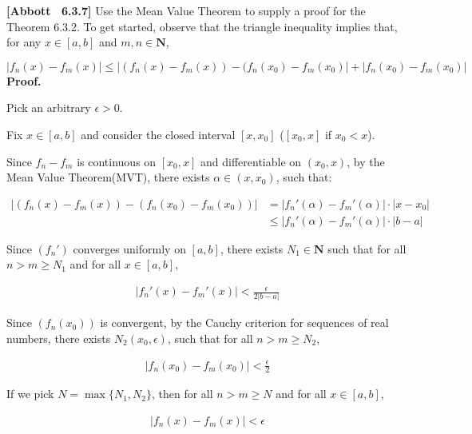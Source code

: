 \documentclass[10pt]{article}
\begin{document}
\textbf{[Abbott \ 6.3.7] }Use the Mean Value Theorem to supply a proof for the Theorem 6.3.2. To get started, observe that the triangle inequality implies that, for any $\displaystyle x\in [ a,b]$ and $\displaystyle m,n\in \mathbf{N}$,




\begin{equation*}
|f_{n}( x) -f_{m}( x) |\leq |( f_{n}( x) -f_{m}( x)) -( f_{n}( x_{0}) -f_{m}( x_{0}) |+|f_{n}( x_{0}) -f_{m}( x_{0}) |
\end{equation*}
\textbf{Proof.}



Pick an arbitrary $\epsilon  >0$.



Fix $x\in [a,b]$ and consider the closed interval $[x,x_{0} ]$ ($[x_{0} ,x]$ if $x_{0} < x$). 



Since $f_{n} -f_{m}$ is continuous on $[x_{0} ,x]$ and differentiable on $(x_{0} ,x)$, by the Mean Value Theorem(MVT), there exists $\alpha \in (x,x_{0} )$, such that:


\begin{align*}
|(f_{n} (x)-f_{m} (x))-(f_{n} (x_{0} )-f_{m} (x_{0} ))| & =|f_{n} '(\alpha )-f_{m} '(\alpha )|\cdot|x -x_{0} |\\
 & \leq |f_{n} '(\alpha )-f_{m} '(\alpha )|\cdot|b -a|
\end{align*}


Since $(f_{n} ')$ converges uniformly on $[a,b]$, there exists $N_{1} \in \mathbf{N}$ such that for all $n >m\geq N_{1}$ and for all $x\in [a,b]$, 


\begin{align*}
|f_{n} '(x)-f_{m} '(x)|< \frac{\epsilon }{2|b-a|}
\end{align*}


Since $(f_{n} (x_{0} ))$ is convergent, by the Cauchy criterion for sequences of real numbers, there exists $N_{2} (x_{0} ,\epsilon )$, such that for all $n >m\geq N_{2}$, 


\begin{align*}
|f_{n} (x_{0} )-f_{m} (x_{0} )|< \frac{\epsilon }{2}
\end{align*}


If we pick $N=\max \{N_{1} ,N_{2} \}$, then for all $n >m\geq N$ and for all $x\in [a,b]$, 


\begin{align*}
|f_{n} (x)-f_{m} (x)|< \epsilon 
\end{align*}
\end{document}
